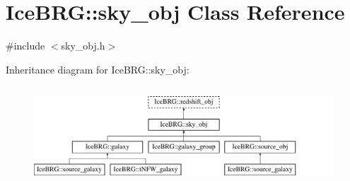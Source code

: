 \hypertarget{classIceBRG_1_1sky__obj}{}\section{Ice\+B\+R\+G\+:\+:sky\+\_\+obj Class Reference}
\label{classIceBRG_1_1sky__obj}


{\ttfamily \#include $<$sky\+\_\+obj.\+h$>$}

Inheritance diagram for Ice\+B\+R\+G\+:\+:sky\+\_\+obj\+:\begin{figure}[H]
\begin{center}
\leavevmode
\includegraphics[height=3.708609cm]{classIceBRG_1_1sky__obj}
\end{center}
\end{figure}
